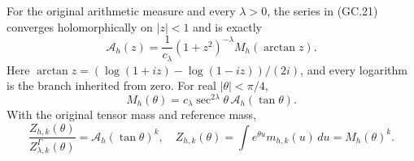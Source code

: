 \begin{theorem}
For the original arithmetic measure and every $\lambda>0$, the series
in (GC.21) converges holomorphically on $|z|<1$ and is exactly
\[
 \boxed{\mathcal A_h(z)=\frac1{c_\lambda}
            (1+z^2)^{-\lambda}M_h(\arctan z).}                 \tag{GC.24}
\]
Here
$\arctan z=(\log(1+iz)-\log(1-iz))/(2i)$, and every logarithm
is the branch inherited from zero. For real $|\theta|<\pi/4$,
\[
 \boxed{M_h(\theta)=c_\lambda\sec^{2\lambda}\theta\,
                        \mathcal A_h(\tan\theta).}             \tag{GC.25}
\]
With the original tensor mass and reference mass,
\[
 \boxed{\frac{Z_{h,k}(\theta)}{Z_{\lambda,k}^\Gamma(\theta)}
       =\mathcal A_h(\tan\theta)^k,\quad
 Z_{h,k}(\theta)=\int e^{\theta u}m_{h,k}(u)\,du=M_h(\theta)^k.}
                                                               \tag{GC.26}
\]
\end{theorem}
